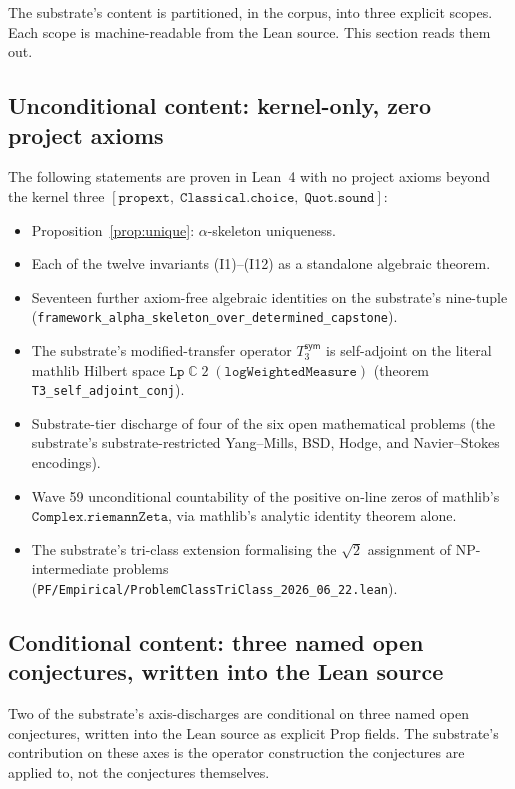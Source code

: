 \documentclass[11pt,a4paper]{amsart}
\theoremstyle{plain}
\theoremstyle{definition}
\begin{document}
The substrate's content is partitioned, in the corpus, into three explicit scopes. Each scope is machine-readable from the Lean source. This section reads them out.

\subsection{Unconditional content: kernel-only, zero project axioms}

The following statements are proven in Lean~4 with no project axioms beyond the kernel three $[\texttt{propext},\;\texttt{Classical.choice},\;\texttt{Quot.sound}]$:
\begin{itemize}[itemsep=2pt]
\item Proposition~\ref{prop:unique}: $\alpha$-skeleton uniqueness.
\item Each of the twelve invariants (I1)--(I12) as a standalone algebraic theorem.
\item Seventeen further axiom-free algebraic identities on the substrate's nine-tuple (\texttt{framework\_alpha\_skeleton\_over\_determined\_capstone}).
\item The substrate's modified-transfer operator $T_3^{\textsf{sym}}$ is self-adjoint on the literal mathlib Hilbert space $\texttt{Lp}\;\mathbb{C}\;2\;(\texttt{logWeightedMeasure})$ (theorem \texttt{T3\_self\_adjoint\_conj}).
\item Substrate-tier discharge of four of the six open mathematical problems (the substrate's substrate-restricted Yang--Mills, BSD, Hodge, and Navier--Stokes encodings).
\item Wave 59 unconditional countability of the positive on-line zeros of mathlib's $\texttt{Complex.riemannZeta}$, via mathlib's analytic identity theorem alone.
\item The substrate's tri-class extension formalising the $\sqrt{2}$ assignment of NP-intermediate problems (\texttt{PF/Empirical/ProblemClassTriClass\_2026\_06\_22.lean}).
\end{itemize}

\subsection{Conditional content: three named open conjectures, written into the Lean source}

Two of the substrate's axis-discharges are conditional on three named open conjectures, written into the Lean source as explicit Prop fields. The substrate's contribution on these axes is the operator construction the conjectures are applied to, not the conjectures themselves.
\end{document}
